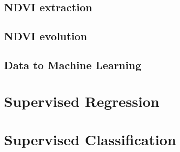 \documentclass[c]{beamer}
\begin{document}
\subsection{NDVI extraction}
\begin{frame}

\end{frame}

\subsection{NDVI evolution}
\begin{frame}

\end{frame}

\subsection{Data to Machine Learning}
\begin{frame}
 
\end{frame}

\section{Supervised Regression}
\begin{frame}

\end{frame}

\section{Supervised Classification}
\begin{frame}

\end{frame}
\end{document}
